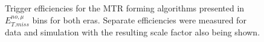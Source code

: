 \begin{figure}[htbp]
  \centering
  \caption{Trigger efficiencies for the MTR forming algorithms presented in $E_{T.miss}^{no,\mu}$ bins for both eras. Separate efficiencies were measured for data and simulation with the resulting scale factor also being shown.}
  \label{fig:metmht_effs}
\end{figure}




